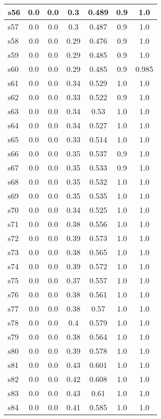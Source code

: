 \documentclass{article}
\begin{document}
\begin{tabular}{|l|c|c|c|c|c|c|}
\hline
s56 &0.0 & 0.0 & 0.3 & 0.489 & 0.9 & 1.0\\
\hline
s57 &0.0 & 0.0 & 0.3 & 0.487 & 0.9 & 1.0\\
\hline
s58 &0.0 & 0.0 & 0.29 & 0.476 & 0.9 & 1.0\\
\hline
s59 &0.0 & 0.0 & 0.29 & 0.485 & 0.9 & 1.0\\
\hline
s60 &0.0 & 0.0 & 0.29 & 0.485 & 0.9 & 0.985\\
\hline
s61 &0.0 & 0.0 & 0.34 & 0.529 & 1.0 & 1.0\\
\hline
s62 &0.0 & 0.0 & 0.33 & 0.522 & 0.9 & 1.0\\
\hline
s63 &0.0 & 0.0 & 0.34 & 0.53 & 1.0 & 1.0\\
\hline
s64 &0.0 & 0.0 & 0.34 & 0.527 & 1.0 & 1.0\\
\hline
s65 &0.0 & 0.0 & 0.33 & 0.514 & 1.0 & 1.0\\
\hline
s66 &0.0 & 0.0 & 0.35 & 0.537 & 0.9 & 1.0\\
\hline
s67 &0.0 & 0.0 & 0.35 & 0.533 & 0.9 & 1.0\\
\hline
s68 &0.0 & 0.0 & 0.35 & 0.532 & 1.0 & 1.0\\
\hline
s69 &0.0 & 0.0 & 0.35 & 0.535 & 1.0 & 1.0\\
\hline
s70 &0.0 & 0.0 & 0.34 & 0.525 & 1.0 & 1.0\\
\hline
s71 &0.0 & 0.0 & 0.38 & 0.556 & 1.0 & 1.0\\
\hline
s72 &0.0 & 0.0 & 0.39 & 0.573 & 1.0 & 1.0\\
\hline
s73 &0.0 & 0.0 & 0.38 & 0.565 & 1.0 & 1.0\\
\hline
s74 &0.0 & 0.0 & 0.39 & 0.572 & 1.0 & 1.0\\
\hline
s75 &0.0 & 0.0 & 0.37 & 0.557 & 1.0 & 1.0\\
\hline
s76 &0.0 & 0.0 & 0.38 & 0.561 & 1.0 & 1.0\\
\hline
s77 &0.0 & 0.0 & 0.38 & 0.57 & 1.0 & 1.0\\
\hline
s78 &0.0 & 0.0 & 0.4 & 0.579 & 1.0 & 1.0\\
\hline
s79 &0.0 & 0.0 & 0.38 & 0.564 & 1.0 & 1.0\\
\hline
s80 &0.0 & 0.0 & 0.39 & 0.578 & 1.0 & 1.0\\
\hline
s81 &0.0 & 0.0 & 0.43 & 0.601 & 1.0 & 1.0\\
\hline
s82 &0.0 & 0.0 & 0.42 & 0.608 & 1.0 & 1.0\\
\hline
s83 &0.0 & 0.0 & 0.43 & 0.61 & 1.0 & 1.0\\
\hline
s84 &0.0 & 0.0 & 0.41 & 0.585 & 1.0 & 1.0\\

\end{tabular}
\end{document}
